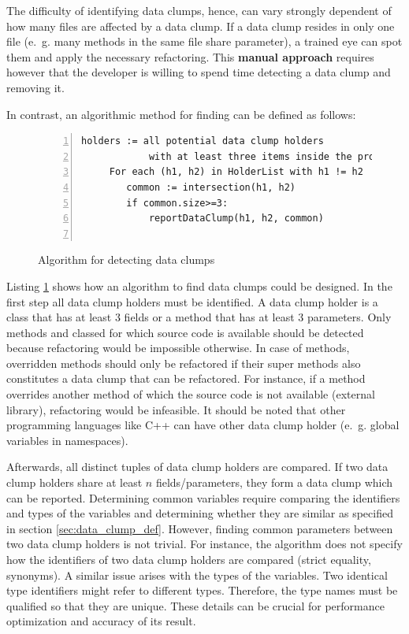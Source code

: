 The difficulty of identifying data clumps, hence, can vary strongly dependent of how many files are affected by a data clump. If a data clump resides in only one file (e.~g. many methods in the same file share parameter), a trained eye can spot them and apply the necessary refactoring. This \textbf{manual approach} requires however that the developer is willing to spend time detecting a data clump and removing it. 

In contrast, an algorithmic method for finding can be defined as follows:
\begin{figure}
\begin{lstlisting}[numbers=left]
    holders := all potential data clump holders 
            with at least three items inside the project
     For each (h1, h2) in HolderList with h1 != h2
        common := intersection(h1, h2)
        if common.size>=3:
            reportDataClump(h1, h2, common)
        

\end{lstlisting}
\caption{Algorithm for detecting data clumps}
\label{lst:data_clumps_algo}
\end{figure}






Listing \ref{lst:data_clumps_algo} shows how an algorithm to find data clumps could be designed. In the first step all data clump holders must be identified.
A data clump holder is a class that has at least 3 fields or a method that has at least 3 parameters.  Only methods and classed for which source code is available should be detected because refactoring would be impossible otherwise. In case of methods, overridden methods should only be refactored if their super methods also constitutes a data clump that can be refactored.  For instance, if a method overrides another method of which the source code is not available (external library), refactoring would be infeasible. 
It should be noted that other programming languages like C++ can have other data clump holder (e.~g. global variables in namespaces). 


Afterwards, all distinct tuples of data clump holders are compared. If two data clump holders share at least $n$ fields/parameters, they form a data clump which can be reported. Determining common variables require comparing the identifiers and types of the variables and determining whether they are similar as specified in section \ref{sec:data_clump_def}. However, finding common parameters between two data clump holders is not trivial.  For instance, the algorithm does not specify how the identifiers of two data clump holders are compared (strict equality, synonyms). A similar issue arises with the types of the variables.  Two identical type identifiers might refer to different types. Therefore, the type names must be qualified so that they are unique. These details can be crucial for performance optimization and accuracy of its result. 



